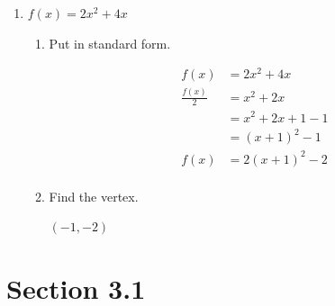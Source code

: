 \documentclass{exam}
\begin{document}
\begin{enumerate}
\begin{enumerate}[a]
      \end{enumerate}

    \item $f(x) = 2x^2 + 4x$ 
      \begin{enumerate}[a]
        \item Put in standard form.
          \begin{solution}
            \begin{align*}
              f(x)           &= 2x^2 + 4x \\
              \frac{f(x)}{2} &= x^2 + 2x \\
                             &= x^2 + 2x + 1 - 1 \\
                             &= (x + 1)^2 - 1 \\
              f(x)           &= 2(x + 1)^2 - 2 \\
            \end{align*}
          \end{solution}
        \item Find the vertex.
          \begin{solution}
            $ (-1, -2) $
          \end{solution}

      \end{enumerate}

  \end{enumerate}

  \pagebreak

  \section{Section 3.1}
\end{document}
